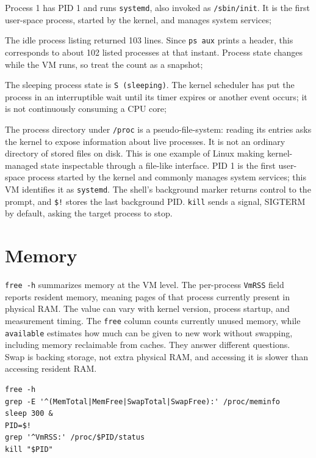 \documentclass{assets/utmreport}
\begin{document}
\begin{utmenumerate}
\item Process 1 has PID 1 and runs \texttt{systemd}, also invoked as \texttt{/sbin/init}. It is the first user-space process, started by the kernel, and manages system services;
\item The idle process listing returned 103 lines. Since \texttt{ps aux} prints a header, this corresponds to about 102 listed processes at that instant. Process state changes while the VM runs, so treat the count as a snapshot;
\item The sleeping process state is \texttt{S (sleeping)}. The kernel scheduler has put the process in an interruptible wait until its timer expires or another event occurs; it is not continuously consuming a CPU core;
\end{utmenumerate}

The process directory under \texttt{/proc} is a pseudo-file-system: reading its entries asks the kernel to expose information about live processes. It is not an ordinary directory of stored files on disk. This is one example of Linux making kernel-managed state inspectable through a file-like interface. PID 1 is the first user-space process started by the kernel and commonly manages system services; this VM identifies it as \texttt{systemd}. The shell's background marker returns control to the prompt, and \texttt{\$!} stores the last background PID. \texttt{kill} sends a signal, SIGTERM by default, asking the target process to stop.

\section{Memory}

\texttt{free -h} summarizes memory at the VM level. The per-process \texttt{VmRSS} field reports resident memory, meaning pages of that process currently present in physical RAM. The value can vary with kernel version, process startup, and measurement timing. The \texttt{free} column counts currently unused memory, while \texttt{available} estimates how much can be given to new work without swapping, including memory reclaimable from caches. They answer different questions. Swap is backing storage, not extra physical RAM, and accessing it is slower than accessing resident RAM.

\noindent\begin{minipage}{\linewidth}
\begin{lstlisting}[caption={Memory totals and one process's resident set}]
free -h
grep -E '^(MemTotal|MemFree|SwapTotal|SwapFree):' /proc/meminfo
sleep 300 &
PID=$!
grep '^VmRSS:' /proc/$PID/status
kill "$PID"
\end{lstlisting}
\end{minipage}\par
\end{document}

